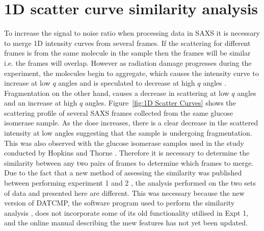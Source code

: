 \section{1D scatter curve similarity analysis}
\label{sec:1D scatter curve similarity analysis}
To increase the signal to noise ratio when processing data in SAXS it is necessary to merge 1D intensity curves from several frames.
If the scattering for different frames is from the same molecule in the sample then the frames will be similar i.e. the frames will overlap.
However as radiation damage progresses during the experiment, the molecules begin to aggregate, which causes the intensity curve to increase at low $q$ angles and is speculated to decrease at high $q$ angles \cite{hopkins2016quantifying}.
Fragmentation on the other hand, causes a decrease in scattering at low $q$ angles and an increase at high $q$ angles.
Figure~\ref{fig:1D Scatter Curves} shows the scattering profile of several SAXS frames collected from the same glucose isomerase sample.
As the dose increases, there is a clear decrease in the scattered intensity at low angles suggesting that the sample is undergoing fragmentation.
This was also observed with the glucose isomerase samples used in the study conducted by Hopkins and Thorne \cite{hopkins2016quantifying}.
Therefore it is necessary to determine the similarity between any two pairs of frames to determine which frames to merge.
Due to the fact that a new method of assessing the similarity was published between performing experiment 1 and 2 \cite{franke2015correlation}, the analysis performed on the two sets of data and presented here are different.
This was necessary because the new version of DATCMP, the software program used to perform the similarity analysis \cite{petoukhov2012new}, does not incorporate some of its old functionality utilised in Expt 1, and the online manual describing the mew features has not yet been updated.
